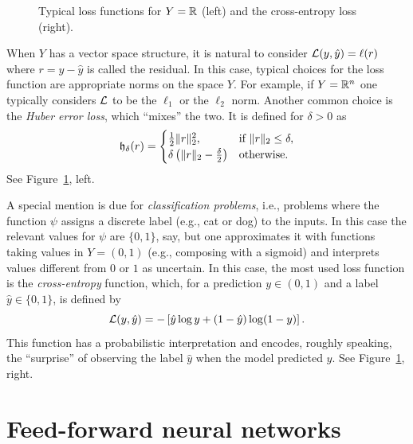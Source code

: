 \begin{figure}
    \centering
    
    \caption{Typical loss functions for $Y=\mathbb{R}$ (left) and the cross-entropy loss (right).}
    \label{fig:losses}
\end{figure}

When $Y$ has a vector space structure, it is natural to consider $\mathcal{L}(y,\hat y)=\ell(r)$ where $r=y-\hat y$ is called the residual.
In this case, typical choices for the loss function are appropriate norms on the space $Y$. 
% 
For example, if $Y=\mathbb{R}^n$ one typically considers $\mathcal{L}$ to be the $\ell_1$ or the $\ell_2$ norm. Another common choice is the \emph{Huber error loss}, which ``mixes'' the two. It is defined for $\delta>0$ as
\begin{equation}
    \mathfrak{h}_\delta(r) =
    \begin{cases}
        \frac12 \|r\|_2^2, & \text{if }\|r\|_2\le \delta,\\
        \delta\left( \|r\|_2 - \frac\delta2 \right)&\text{otherwise.}
    \end{cases}
\end{equation}
See Figure~\ref{fig:losses}, left.

A special mention is due for \emph{classification problems}, i.e., problems where the function $\psi$ assigns a discrete label (e.g., cat or dog) to the inputs. In this case the relevant values for $\psi$ are $\{0,1\}$, say, but one approximates it with functions taking values in $Y=(0,1)$ (e.g., composing with a sigmoid) and interprets values different from $0$ or $1$ as uncertain.
In this case, the most used loss function is the \emph{cross-entropy} function, which, for a prediction $y\in(0,1)$ and a label $\hat y\in\{0,1\}$, is defined by
\begin{equation}
    \mathcal{L}(y,\hat y) = -\left[ \hat y \log  y + (1-\hat y)\log(1- y) \right].
\end{equation}
This function has a probabilistic interpretation and encodes, roughly speaking, the ``surprise'' of observing the label $\hat y$ when the model predicted $y$.
See Figure~\ref{fig:losses}, right.









\chapter{Feed-forward neural networks}


